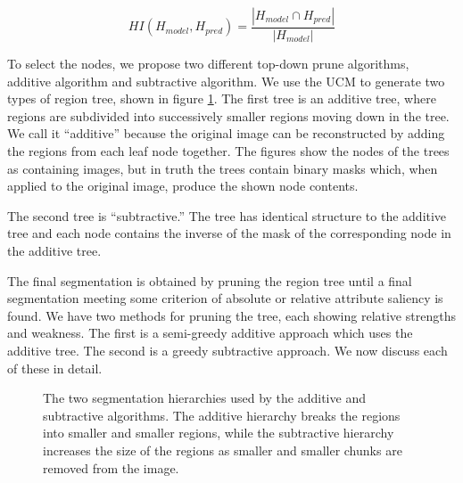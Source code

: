 \documentclass[10pt,twocolumn,letterpaper]{article}
\begin{document}
\[ HI(H_{model},H_{pred}) = \frac{|H_{model} \cap H_{pred}|}{|H_{model}|} \]


To select the nodes, we propose two different top-down prune algorithms, additive algorithm and subtractive algorithm. We use the UCM to generate two types of region tree, shown in figure \ref{fig:tree}.
The first tree is an additive tree, where regions are subdivided into successively
smaller regions moving down in the tree.  We call it ``additive'' because the
original image can be reconstructed by adding the regions from each leaf node
together.  The figures show the nodes of the trees as containing images, but in
truth the trees contain binary masks which, when applied to the original image,
produce the shown node contents.

The second tree is ``subtractive.''  The tree has identical structure to the additive
tree and each node contains the inverse of the mask of the corresponding node
in the additive tree.

The final segmentation is obtained by pruning the region tree until a final segmentation
meeting some criterion of absolute or relative attribute saliency is found.
We have two methods for pruning the tree, each showing relative strengths and
weakness.  The first is a semi-greedy additive approach which uses the additive
tree.  The second is a greedy subtractive approach.  We now discuss each of these 
in detail.

\begin{figure}
\centering
{}
\caption{The two segmentation hierarchies used by the additive 
and subtractive  algorithms.  The additive hierarchy breaks the
regions into smaller and smaller regions, while the subtractive hierarchy increases
the size of the regions as smaller and smaller chunks are removed from the image.}
\label{fig:tree}
\end{figure}
\end{document}
